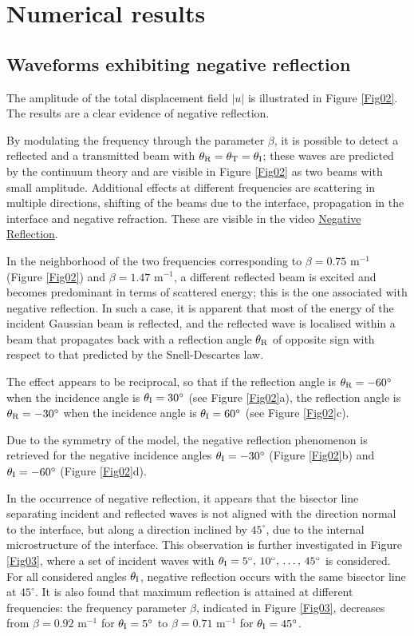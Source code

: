 \documentclass[10p]{article}
\begin{document}
\section{Numerical results}
\subsection{Waveforms exhibiting negative reflection}

The amplitude of the total displacement field $|u|$ is illustrated in Figure \ref{Fig02}. The results are a clear evidence of negative reflection.

By modulating the frequency through the parameter $\beta$, it is possible to detect a reflected and a transmitted beam with $\theta_\textup{R}=\theta_\textup{T}=\theta_\textup{I}$; these waves are predicted by the continuum theory and are visible in Figure \ref{Fig02} as two beams with small amplitude. Additional effects at different frequencies are scattering in multiple directions, shifting of the beams due to the interface, propagation in the interface and negative refraction. These are visible in the video \href{https://clipchamp.com/watch/EHP8HLEM50N}{Negative Reflection}.

In the neighborhood of the two frequencies corresponding to $\beta=0.75$ m$^{-1}$ (Figure \ref{Fig02}) and $\beta=1.47$ m$^{-1}$, a different reflected beam is excited and becomes predominant in terms of scattered energy; this is the one associated with negative reflection.   
In such a case, it is apparent that most of the energy of the incident Gaussian beam is reflected, and the reflected wave is localised within a beam that propagates back with a reflection angle $\theta_\textup{R}$ of opposite sign with respect to that predicted by the Snell-Descartes law.


The effect appears to be reciprocal, so that if the reflection angle is $\theta_\textup{R}=-60^\circ$ when the incidence angle is $\theta_\textup{I}=30^\circ$ (see Figure \ref{Fig02}a), the reflection angle is $\theta_\textup{R}=-30^\circ$ when the incidence angle is $\theta_\textup{I}=60^\circ$ (see Figure \ref{Fig02}c).

Due to the symmetry of the model, the negative reflection phenomenon is retrieved for the negative incidence angles $\theta_\textup{I}=-30^\circ$ (Figure \ref{Fig02}b) and 
$\theta_\textup{I}=-60^\circ$ (Figure \ref{Fig02}d).

In the occurrence of negative reflection, it appears that the bisector line separating incident and reflected waves is not aligned with the direction normal to the interface, but along a direction inclined by $45^\circ$, due to the internal microstructure of the interface. 
This observation is further investigated in Figure \ref{Fig03}, where a set of incident waves with $\theta_\textup{I}=5^\circ,\,10^\circ,\,\ldots,\,45^\circ$ is considered.
For all considered angles $\theta_\textup{I}$, negative reflection occurs with the same bisector line at $45^\circ$. It is also found that maximum reflection is attained at different frequencies: the frequency parameter $\beta$, indicated in Figure \ref{Fig03},
decreases from $\beta=0.92$ m$^{-1}$ for $\theta_\textup{I}=5^\circ$ to $\beta=0.71$ m$^{-1}$ 
for $\theta_\textup{I}=45^\circ$.
\end{document}
